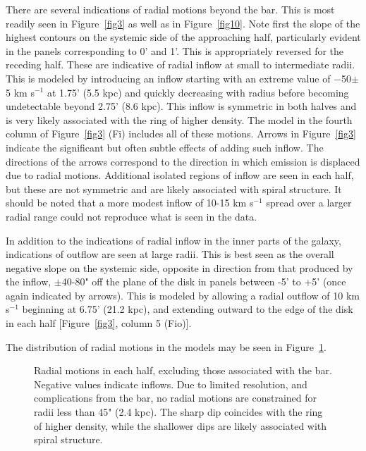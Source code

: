 \documentclass{emulateapj}
\begin{document}
\par
    There are several indications of radial motions beyond the bar.  This is most readily seen in Figure~\ref{fig3} as well as in Figure~\ref{fig10}.  Note first the slope of the highest contours on the systemic side of the approaching half, particularly evident in the panels corresponding to 0' and 1'.  This is appropriately reversed for the receding half.  These are indicative of radial inflow at small to intermediate radii.  This is modeled by introducing an inflow starting with an extreme value of $-$50$\pm$5 km s$^{-1}$ at 1.75' (5.5 kpc) and quickly decreasing with radius before becoming undetectable beyond 2.75' (8.6 kpc).  This inflow is symmetric in both halves and is very likely associated with the ring of higher density. The model in the fourth column of Figure~\ref{fig3} (Fi) includes all of these motions. Arrows in Figure~\ref{fig3} indicate the significant but often subtle effects of adding such inflow.  The directions of the arrows correspond to the direction in which emission is displaced due to radial motions.  Additional isolated regions of inflow are seen in each half, but these are not symmetric and are likely associated with spiral structure.  It should be noted that a more modest inflow of 10-15 km s$^{-1}$ spread over a larger radial range could not reproduce what is seen in the data.  

\par
     In addition to the indications of radial inflow in the inner parts of the galaxy, indications of outflow are seen at large radii.  This is best seen as the overall negative slope on the systemic side, opposite in direction from that produced by the inflow, $\pm$40-80" off the plane of the disk in panels between -5' to +5' (once again indicated by arrows).  This is modeled by allowing a radial outflow of 10 km s$^{-1}$ beginning at 6.75' (21.2 kpc), and extending outward to the edge of the disk in each half [Figure~\ref{fig3}, column 5 (Fio)]. 

\par
     The distribution of radial motions in the models may be seen in Figure~\ref{fig11}.

\begin{figure}
\caption{Radial motions in each half, excluding those associated with the bar.  Negative values indicate inflows.  Due to limited resolution, and complications from the bar, no radial motions are constrained for radii less than 45" (2.4 kpc).  The sharp dip coincides with the ring of higher density, while the shallower dips are likely associated with spiral structure.\label{fig11}}
\end{figure}
\end{document}
